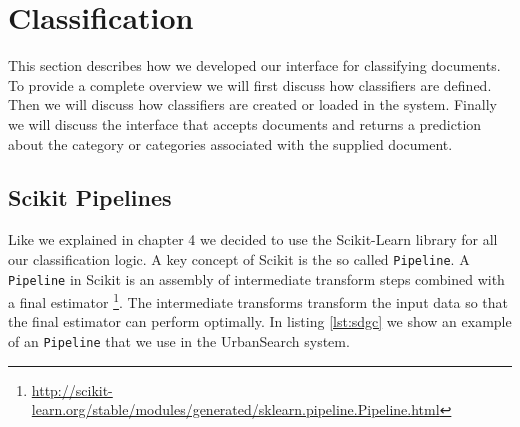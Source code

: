 \section{Classification}\label{5-classification}
This section describes how we developed our interface for classifying documents. To provide a complete overview we will first discuss how classifiers are defined. Then we will discuss how classifiers are created or loaded in the system. Finally we will discuss the interface that accepts documents and returns a prediction about the category or categories associated with the supplied document.
\subsection{Scikit Pipelines}
Like we explained in chapter 4 we decided to use the Scikit-Learn library for all our classification logic. A key concept of Scikit is the so called \texttt{Pipeline}. A \texttt{Pipeline} in Scikit is an assembly of intermediate transform steps combined with a final estimator \footnote{\url{http://scikit-learn.org/stable/modules/generated/sklearn.pipeline.Pipeline.html}}. The intermediate transforms transform the input data so that the final estimator can perform optimally. In listing \ref{lst:sdgc} we show an example of an \texttt{Pipeline} that we use in the UrbanSearch system. 


